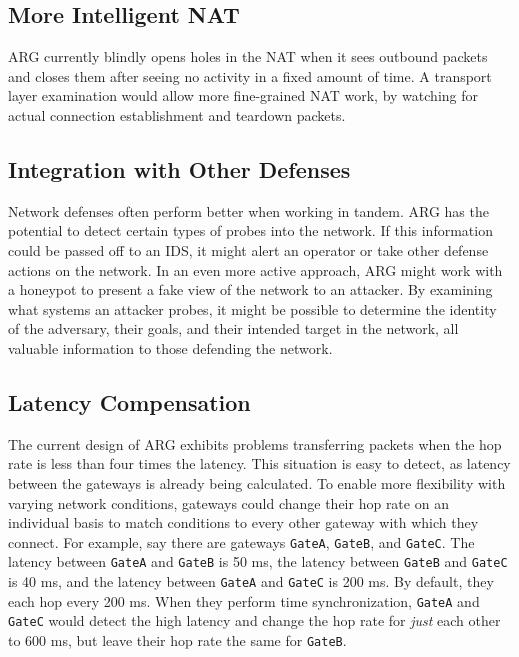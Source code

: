 
\subsection{More Intelligent NAT}
\par \ac{ARG} currently blindly opens holes in the \ac{NAT} when it sees outbound packets and closes them after seeing no activity in a fixed amount of time. A transport layer examination would allow more fine-grained \ac{NAT} work, by watching for actual connection establishment and teardown packets. 

\subsection{Integration with Other Defenses}
\par Network defenses often perform better when working in tandem. \ac{ARG} has the potential to detect certain types of probes into the network. If this information could be passed off to an \ac{IDS}, it might alert an operator or take other defense actions on the network. In an even more active approach, \ac{ARG} might work with a honeypot to present a fake view of the network to an attacker. By examining what systems an attacker probes, it might be possible to determine the identity of the adversary, their goals, and their intended target in the network, all valuable information to those defending the network.

\subsection{Latency Compensation}
\par The current design of \ac{ARG} exhibits problems transferring packets when the hop rate is less than four times the latency. This situation is easy to detect, as latency between the gateways is already being calculated. To enable more flexibility with varying network conditions, gateways could change their hop rate on an individual basis to match conditions to every other gateway with which they connect. For example, say there are gateways \texttt{GateA}, \texttt{GateB}, and \texttt{GateC}. The latency between \texttt{GateA} and \texttt{GateB} is 50 ms, the latency between \texttt{GateB} and \texttt{GateC} is 40 ms, and the latency between \texttt{GateA} and \texttt{GateC} is 200 ms. By default, they each hop every 200 ms. When they perform time synchronization, \texttt{GateA} and \texttt{GateC} would detect the high latency and change the hop rate for \textit{just} each other to 600 ms, but leave their hop rate the same for \texttt{GateB}. 

